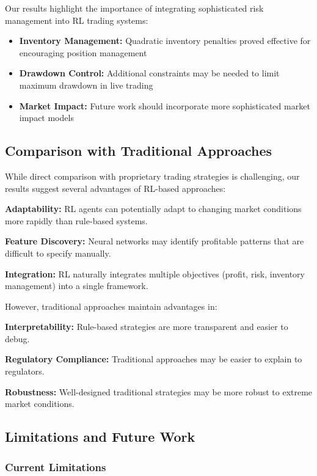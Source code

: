 \documentclass[conference]{IEEEtran}
\begin{document}
Our results highlight the importance of integrating sophisticated risk management into RL trading systems:

\begin{itemize}
\item \textbf{Inventory Management:} Quadratic inventory penalties proved effective for encouraging position management
\item \textbf{Drawdown Control:} Additional constraints may be needed to limit maximum drawdown in live trading
\item \textbf{Market Impact:} Future work should incorporate more sophisticated market impact models
\end{itemize}

\subsection{Comparison with Traditional Approaches}

While direct comparison with proprietary trading strategies is challenging, our results suggest several advantages of RL-based approaches:

\textbf{Adaptability:} RL agents can potentially adapt to changing market conditions more rapidly than rule-based systems.

\textbf{Feature Discovery:} Neural networks may identify profitable patterns that are difficult to specify manually.

\textbf{Integration:} RL naturally integrates multiple objectives (profit, risk, inventory management) into a single framework.

However, traditional approaches maintain advantages in:

\textbf{Interpretability:} Rule-based strategies are more transparent and easier to debug.

\textbf{Regulatory Compliance:} Traditional approaches may be easier to explain to regulators.

\textbf{Robustness:} Well-designed traditional strategies may be more robust to extreme market conditions.

\subsection{Limitations and Future Work}

\subsubsection{Current Limitations}
\end{document}
